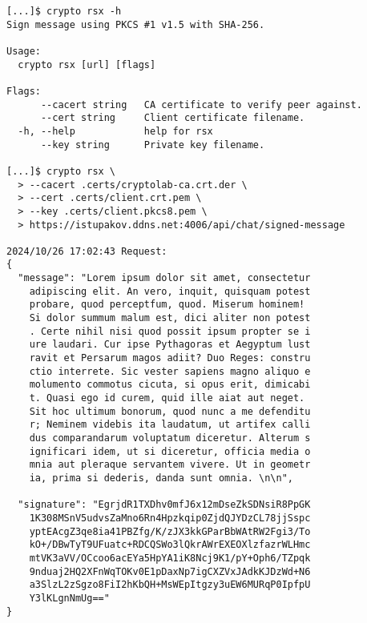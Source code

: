 \documentclass[12pt, a4paper]{article}
\begin{document}
\begin{verbatim}
[...]$ crypto rsx -h
Sign message using PKCS #1 v1.5 with SHA-256.

Usage:
  crypto rsx [url] [flags]

Flags:
      --cacert string   CA certificate to verify peer against.
      --cert string     Client certificate filename.
  -h, --help            help for rsx
      --key string      Private key filename.

[...]$ crypto rsx \
  > --cacert .certs/cryptolab-ca.crt.der \
  > --cert .certs/client.crt.pem \
  > --key .certs/client.pkcs8.pem \
  > https://istupakov.ddns.net:4006/api/chat/signed-message

2024/10/26 17:02:43 Request:
{
  "message": "Lorem ipsum dolor sit amet, consectetur 
    adipiscing elit. An vero, inquit, quisquam potest 
    probare, quod perceptfum, quod. Miserum hominem! 
    Si dolor summum malum est, dici aliter non potest
    . Certe nihil nisi quod possit ipsum propter se i
    ure laudari. Cur ipse Pythagoras et Aegyptum lust
    ravit et Persarum magos adiit? Duo Reges: constru
    ctio interrete. Sic vester sapiens magno aliquo e
    molumento commotus cicuta, si opus erit, dimicabi
    t. Quasi ego id curem, quid ille aiat aut neget. 
    Sit hoc ultimum bonorum, quod nunc a me defenditu
    r; Neminem videbis ita laudatum, ut artifex calli
    dus comparandarum voluptatum diceretur. Alterum s
    ignificari idem, ut si diceretur, officia media o
    mnia aut pleraque servantem vivere. Ut in geometr
    ia, prima si dederis, danda sunt omnia. \n\n",

  "signature": "EgrjdR1TXDhv0mfJ6x12mDseZkSDNsiR8PpGK
    1K308MSnV5udvsZaMno6Rn4Hpzkqip0ZjdQJYDzCL78jjSspc
    yptEAcgZ3qe8ia41PBZfg/K/zJX3kkGParBbWAtRW2Fgi3/To
    kO+/DBwTyT9UFuatc+RDCQSWo3lQkrAWrEXEOXlzfazrWLHmc
    mtVK3aVV/OCcoo6acEYa5HpYA1iK8Ncj9K1/pY+Oph6/TZpqk
    9nduaj2HQ2XFnWqTOKv0E1pDaxNp7igCXZVxJAdkKJDzWd+N6
    a3SlzL2zSgzo8FiI2hKbQH+MsWEpItgzy3uEW6MURqP0IpfpU
    Y3lKLgnNmUg=="
}
\end{verbatim}
\end{document}
